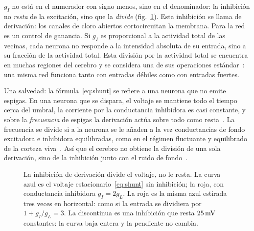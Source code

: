 $g_I$ no está en el numerador con signo menos, sino en el denominador: la inhibición no \emph{resta} de la excitación, sino que la \emph{divide} (fig.~\ref{fig:shunt}). Esta inhibición se llama de derivación: los canales de cloro abiertos cortocircuitan la membrana. Para la red es un control de ganancia. Si $g_I$ es proporcional a la actividad total de las vecinas, cada neurona no responde a la intensidad absoluta de su entrada, sino a su fracción de la actividad total. Esta división por la actividad total se encuentra en muchas regiones del cerebro y se considera una de sus operaciones estándar~\cite{Carandini2012}: una misma red funciona tanto con entradas débiles como con entradas fuertes.

Una salvedad: la fórmula~\eqref{eq:shunt} se refiere a una neurona que no emite espigas. En una neurona que se dispara, el voltaje se mantiene todo el tiempo cerca del umbral, la corriente por la conductancia inhibidora es casi constante, y sobre la \emph{frecuencia} de espigas la derivación actúa sobre todo como resta~\cite{HoltKoch1997}. La frecuencia se divide si a la neurona se le añaden a la vez conductancias de fondo excitadora e inhibidora equilibradas, como en el régimen fluctuante y equilibrado de la corteza viva~\cite{Chance2002}. Así que el cerebro no obtiene la división de una sola derivación, sino de la inhibición junto con el ruido de fondo~\cite{Carandini2012}.

\begin{figure}[t]
\centering
{}
\caption{La inhibición de derivación divide el voltaje, no le resta. La curva azul es el voltaje estacionario~\eqref{eq:shunt} sin inhibición; la roja, con conductancia inhibidora $g_I=2g_L$. La roja es la misma azul estirada tres veces en horizontal: como si la entrada se dividiera por $1+g_I/g_L=3$. La discontinua es una inhibición que resta $25\,\text{mV}$ constantes: la curva baja entera y la pendiente no cambia.}
\label{fig:shunt}
\end{figure}

